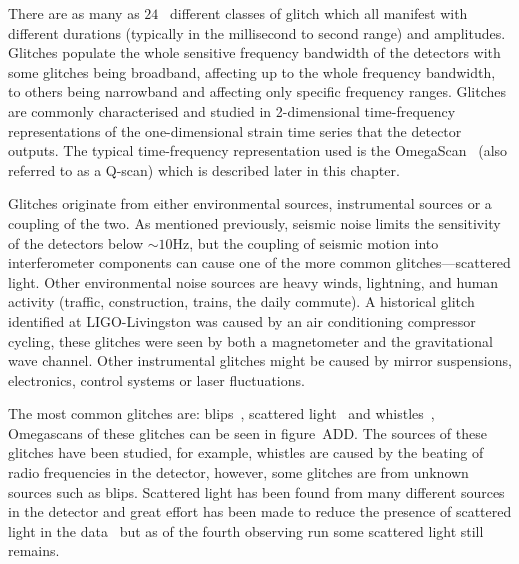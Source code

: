
There are as many as $24$~\cite{gravityspy:2023} different classes of glitch which all manifest with different durations (typically in the millisecond to second range) and amplitudes. Glitches populate the whole sensitive frequency bandwidth of the detectors with some glitches being broadband, affecting up to the whole frequency bandwidth, to others being narrowband and affecting only specific frequency ranges. Glitches are commonly characterised and studied in 2-dimensional time-frequency representations of the one-dimensional strain time series that the detector outputs. The typical time-frequency representation used is the OmegaScan~\cite{qscan:2004} (also referred to as a Q-scan) which is described later in this chapter.


Glitches originate from either environmental sources, instrumental sources or a coupling of the two. As mentioned previously, seismic noise limits the sensitivity of the detectors below $\sim10$Hz, but the coupling of seismic motion into interferometer components can cause one of the more common glitches---scattered light. Other environmental noise sources are heavy winds, lightning, and human activity (traffic, construction, trains, the daily commute). A historical glitch identified at LIGO-Livingston was caused by an air conditioning compressor cycling, these glitches were seen by both a magnetometer and the gravitational wave channel. Other instrumental glitches might be caused by mirror suspensions, electronics, control systems or laser fluctuations.
%
%


The most common glitches are: blips~\cite{blips:2019}, scattered light~\cite{ArchEnemy:2023} and whistles~\cite{glitschen:2021}, Omegascans of these glitches can be seen in figure~ADD. The sources of these glitches have been studied, for example, whistles are caused by the beating of radio frequencies in the detector, however, some glitches are from unknown sources such as blips. Scattered light has been found from many different sources in the detector and great effort has been made to reduce the presence of scattered light in the data~\cite{reducing_scattering:2020} but as of the fourth observing run some scattered light still remains.
%
%



